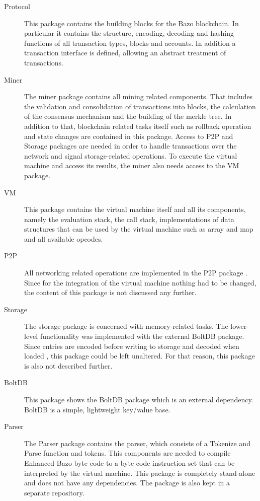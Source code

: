 \begin{description}
	\item[Protocol] This package contains the building blocks for the Bazo blockchain. In particular it contains the structure, encoding, decoding and hashing functions of all transaction types, blocks and accounts. In addition a transaction interface is defined, allowing an abstract treatment of transactions. \cite{ba_miner}
	\item[Miner] The miner package contains all mining related components. That includes the validation and consolidation of transactions into blocks, the calculation of the consensus mechanism and the building of the merkle tree. In addition to that, blockchain related tasks itself such as rollback operation and state changes are contained in this package. Access to P2P and Storage packages are needed in order to handle transactions over the network and signal storage-related operations. \cite{ba_miner} To execute the virtual machine and access its results, the miner also needs access to the VM package.
	\item[VM] This package contains the virtual machine itself and all its components, namely the evaluation stack, the call stack, implementations of data structures that can be used by the virtual machine such as array and map and all available opcodes.
	\item[P2P] All networking related operations are implemented in the P2P package \cite{ba_miner}. Since for the integration of the virtual machine nothing had to be changed, the content of this package is not discussed any further.
	\item[Storage] The storage package is concerned with memory-related tasks. The lower-level functionality was implemented with the external BoltDB package. Since entries are encoded before writing to storage and decoded when loaded \cite{ba_miner}, this package could be left unaltered. For that reason, this package is also not described further.
	\item[BoltDB] This package shows the BoltDB package which is an external dependency. BoltDB is a simple, lightweight key/value base. \cite{ba_miner}
	\item[Parser] The Parser package contains the parser, which consists of a Tokenize and Parse function and tokens. This components are needed to compile \flqq Enhanced Bazo byte code\frqq{ } to a byte code instruction set that can be interpreted by the virtual machine. This package is completely stand-alone and does not have any dependencies. The package is also kept in a separate repository.
\end{description}

